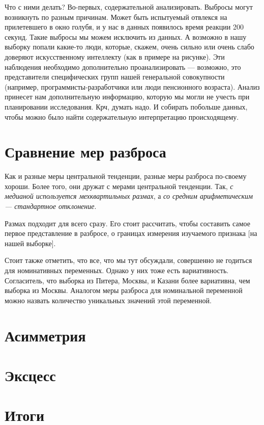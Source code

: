 \documentclass[
  letterpaper,
  DIV=11,
  numbers=noendperiod]{scrreprt}
\theoremstyle{definition}
\theoremstyle{remark}
\begin{document}
Что с ними делать? Во-первых, содержательной анализировать. Выбросы
могут возникнуть по разным причинам. Может быть испытуемый отвлекся на
прилетевшего в окно голубя, и у нас в данных появилось время реакции 200
секунд. Такие выбросы мы можем исключить из данных. А возможно в нашу
выборку попали какие-то люди, которые, скажем, очень сильно или очень
слабо доверяют искусственному интеллекту (как в примере на рисунке). Эти
наблюдения необходимо дополнительно проанализировать --- возможно, это
представители специфических групп нашей генеральной совокупности
(например, программисты-разработчики или люди пенсионного возраста).
Анализ принесет нам дополнительную информацию, которую мы могли не
учесть при планировании исследования. Крч, думать надо. И собирать
побольше данных, чтобы можно было найти содержательную интерпретацию
происходящему.

\section{Сравнение мер
разброса}\label{andan-descriptives_variation_comparison}

Как и разные меры центральной тенденции, разные меры разброса по-своему
хороши. Более того, они дружат с мерами центральной тенденции. Так,
\emph{с медианой используется мехквартильных размах}, а \emph{со средним
арифметическим --- стандартное отклонение}.

Размах подходит для всего сразу. Его стоит рассчитать, чтобы составить
самое первое представление в разбросе, о границах измерения изучаемого
признака {[}на нашей выборке{]}.

Стоит также отметить, что все, что мы тут обсуждали, совершенно не
годиться для номинативных переменных. Однако у них тоже есть
вариативность. Согласитель, что выборка из Питера, Москвы, и Казани
более вариативна, чем выборка из Москвы. Аналогом меры разброса для
номинальной переменной можно назвать количество уникальных значений этой
переменной.

\section{Асимметрия}\label{andan-descriptives-skewness}

\section{Эксцесс}\label{andan-descriptives-kurtosis}

\section{Итоги}\label{andan-descriptives-final}
\end{document}
